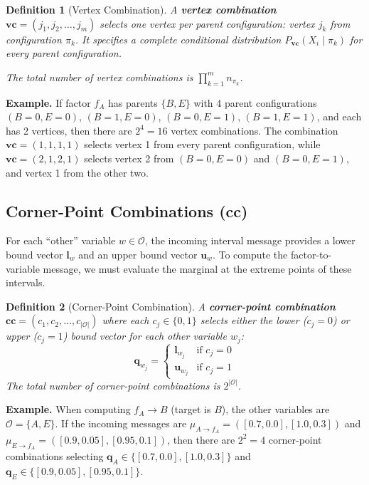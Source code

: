 \documentclass[11pt]{article}
\newtheorem{definition}{Definition}
\begin{document}
\begin{definition}[Vertex Combination]
A \textbf{vertex combination} $\mathbf{vc} = (j_1, j_2, \dots, j_m)$ selects one vertex per parent
configuration: vertex $j_k$ from configuration $\pi_k$. It specifies a complete conditional
distribution $P_{\mathbf{vc}}(X_i \mid \pi_k)$ for every parent configuration.

The total number of vertex combinations is $\prod_{k=1}^{m} n_{\pi_k}$.
\end{definition}

\textbf{Example.} If factor $f_A$ has parents $\{B, E\}$ with 4 parent configurations
$(B{=}0,E{=}0)$, $(B{=}1,E{=}0)$, $(B{=}0,E{=}1)$, $(B{=}1,E{=}1)$, and each has
2 vertices, then there are $2^4 = 16$ vertex combinations. The combination $\mathbf{vc} = (1,1,1,1)$
selects vertex 1 from every parent configuration, while $\mathbf{vc} = (2,1,2,1)$ selects vertex 2
from $(B{=}0,E{=}0)$ and $(B{=}0,E{=}1)$, and vertex 1 from the other two.

\subsection{Corner-Point Combinations (cc)}\label{sec:cc}

For each ``other'' variable $w \in \mathcal{O}$, the incoming interval message provides
a lower bound vector $\mathbf{l}_w$ and an upper bound vector $\mathbf{u}_w$. To
compute the factor-to-variable message, we must evaluate the marginal at the extreme
points of these intervals.

\begin{definition}[Corner-Point Combination]
A \textbf{corner-point combination} $\mathbf{cc} = (c_1, c_2, \dots, c_{|\mathcal{O}|})$ where each $c_j \in \{0, 1\}$
selects either the \emph{lower} ($c_j = 0$) or \emph{upper} ($c_j = 1$) bound vector
for each other variable $w_j$:
\[
  \mathbf{q}_{w_j} = \begin{cases}
    \mathbf{l}_{w_j} & \text{if } c_j = 0 \\
    \mathbf{u}_{w_j} & \text{if } c_j = 1
  \end{cases}
\]
The total number of corner-point combinations is $2^{|\mathcal{O}|}$.
\end{definition}

\textbf{Example.} When computing $f_A \to B$ (target is $B$), the other variables are
$\mathcal{O} = \{A, E\}$. If the incoming messages are $\mu_{A \to f_A} = ([0.7, 0.0], [1.0, 0.3])$
and $\mu_{E \to f_A} = ([0.9, 0.05], [0.95, 0.1])$, then there are $2^2 = 4$ corner-point
combinations selecting $\mathbf{q}_A \in \{[0.7, 0.0], [1.0, 0.3]\}$ and
$\mathbf{q}_E \in \{[0.9, 0.05], [0.95, 0.1]\}$.
\end{document}

